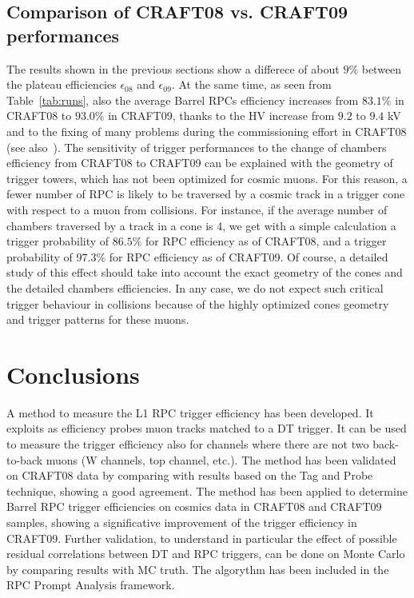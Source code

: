 \subsection{Comparison of CRAFT08 vs. CRAFT09 performances}
\label{comparison}
The results shown in the previous sections show a differece of about
$9 \% $ between the plateau efficiencies $\epsilon_{08}$ and $\epsilon_{09}$.
At the same time, as seen from Table~\ref{tab:runs}, also the average Barrel RPCs 
efficiency increases from $83.1\%$ in CRAFT08 to $93.0\%$ in CRAFT09, thanks to the HV increase 
from $9.2$ to $9.4$ kV and to the fixing of many problems during the commissioning 
effort in CRAFT08 (see also~\cite{ref:craft08pap}). The sensitivity of trigger performances 
to the change of chambers efficiency from CRAFT08
to CRAFT09 can be explained with the geometry of trigger
towers, which has not been optimized for cosmic muons. For this reason,
a fewer number of RPC is likely to be traversed by a cosmic track 
in a trigger cone with respect to a muon from collisions. For instance, if the average number 
of chambers traversed by a track in a cone is 4, we get with a simple calculation 
a trigger probability of $86.5\%$ for RPC 
efficiency as of CRAFT08, and a trigger probability of 
$97.3\%$ for RPC efficiency as of CRAFT09. 
Of course, a detailed study of this effect should take into account the exact geometry of the 
cones and the detailed chambers efficiencies.
In any case, we do not expect such critical trigger behaviour in collisions because 
of the highly optimized cones geometry and trigger patterns for these muons.

\section{Conclusions}
A method to measure the L1 RPC trigger efficiency has been developed.
It exploits as efficiency probes muon tracks matched to a DT trigger. 
It can be used to measure the trigger efficiency also for channels where 
there are not two back-to-back muons (W channels, top channel, etc.).
The method has been validated on CRAFT08 data by comparing with results 
based on the Tag and Probe technique, showing a good agreement.
The method has been applied to determine Barrel RPC trigger efficiencies 
on cosmics data in CRAFT08 and CRAFT09 samples, showing a significative 
improvement of the trigger efficiency in CRAFT09.
Further validation, to understand in particular the effect of possible 
residual correlations between DT and RPC triggers, can be done on Monte Carlo 
by comparing results with MC truth.
The algorythm has been included in the RPC Prompt Analysis framework.



